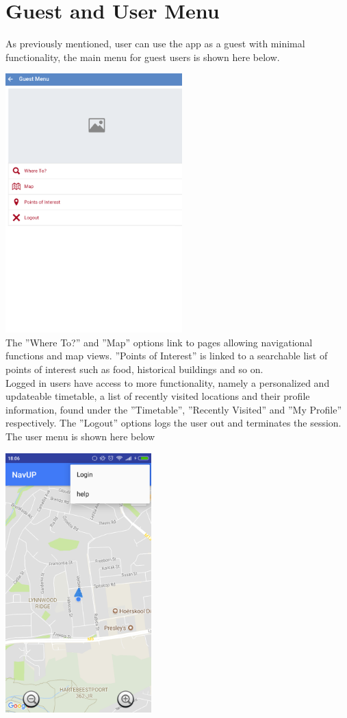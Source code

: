 \documentclass{article}
\begin{document}
\newpage
\section{Guest and User Menu}
	As previously mentioned, user can use the app as a guest with minimal functionality, the main menu for guest users is shown here below.
	\\
	\par
	\includegraphics[height=10cm]{guestmenu.png}
	\\
	The ''Where To?'' and ''Map'' options link to pages allowing navigational functions and map views. ''Points of Interest'' is linked to a searchable list of points of interest such as food, historical buildings and so on.
	\\
	Logged in users have access to more functionality, namely a personalized and updateable timetable, a list of recently visited locations and their profile information, found under the ''Timetable'', ''Recently Visited'' and ''My Profile'' respectively. The ''Logout'' options logs the user out and terminates the session. The user menu is shown here below
	\\
	\par
	\includegraphics[height=10cm]{menu.png}
	
\end{document}
